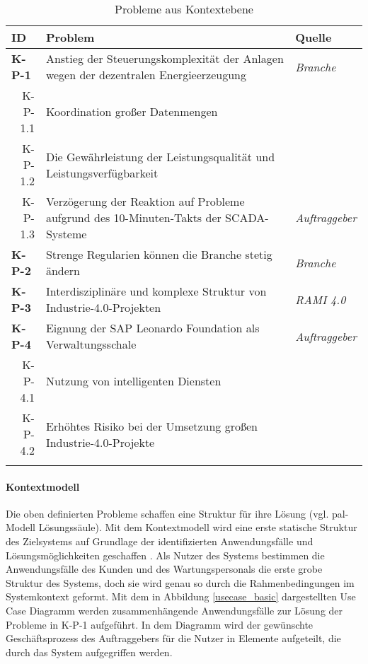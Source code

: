 \begin{table}[H]
  \begin{tabularx}{\textwidth}{@{}lXp{2cm}@{}}
      \toprule
      ID                & Problem & Quelle \\
      \midrule
      \textbf{K-P-1}              &       Anstieg der Steuerungskomplexität der Anlagen wegen der dezentralen Energieerzeugung               & \textit{Branche}                \\
      \multicolumn{1}{r}{K-P-1.1} &  Koordination großer Datenmengen     \\
      \multicolumn{1}{r}{K-P-1.2} &  Die Gewährleistung der Leistungsqualität und Leistungsverfügbarkeit \\
      \multicolumn{1}{r}{K-P-1.3} &  Verzögerung der Reaktion auf Probleme aufgrund des 10-Minuten-Takts der SCADA-Systeme & \textit{Auftraggeber} \\\addlinespace
      \textbf{K-P-2}              & Strenge Regularien können die Branche stetig ändern                     & \textit{Branche}                \\ \addlinespace
      \textbf{K-P-3}              & Interdisziplinäre und komplexe Struktur von Industrie-4.0-Projekten                      & \textit{RAMI 4.0}                \\
      \textbf{K-P-4}              &  Eignung der SAP Leonardo Foundation als Verwaltungsschale  & \textit{Auftraggeber} \\
      \multicolumn{1}{r}{K-P-4.1} &  Nutzung von intelligenten Diensten\\
      \multicolumn{1}{r}{K-P-4.2} &  Erhöhtes Risiko bei der Umsetzung großen Industrie-4.0-Projekte\\
      \addlinespace
      \bottomrule
  \end{tabularx}
  \label{kontext_probleme}
  \caption{Probleme aus Kontextebene}
\end{table}

\paragraph{Kontextmodell}

Die oben definierten Probleme schaffen eine Struktur für ihre Lösung (vgl. \ac{pal}-Modell Lösungssäule). Mit dem  Kontextmodell wird eine erste statische Struktur des Zielsystems auf Grundlage der identifizierten Anwendungsfälle und Lösungsmöglichkeiten geschaffen \citep{Lauenroth2016}. Als Nutzer des Systems bestimmen die Anwendungsfälle des Kunden und des Wartungspersonals die erste grobe Struktur des Systems, doch sie wird genau so durch die Rahmenbedingungen im Systemkontext geformt.
Mit dem in Abbildung \ref{usecase_basic} dargestellten Use Case Diagramm werden zusammenhängende Anwendungsfälle zur Lösung der Probleme in K-P-1 aufgeführt. In dem Diagramm wird der gewünschte Geschäftsprozess des Auftraggebers für die Nutzer in Elemente aufgeteilt, die durch das System aufgegriffen werden.

